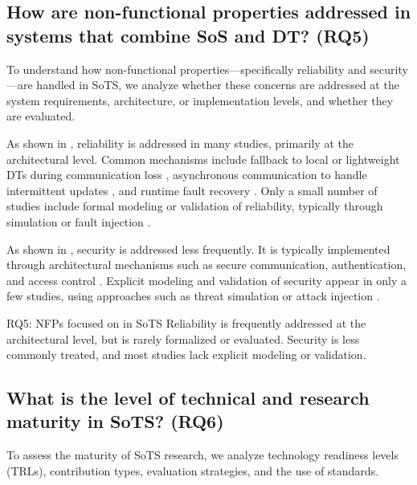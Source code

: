 \subsection{How are non-functional properties addressed in systems that combine SoS and DT? (RQ5)}\label{results-rq5}

To understand how non-functional properties---specifically reliability and security---are handled in SoTS, we analyze whether these concerns are addressed at the system requirements, architecture, or implementation levels, and whether they are evaluated.



As shown in , reliability is addressed in many studies, primarily at the architectural level. Common mechanisms include fallback to local or lightweight DTs during communication loss \cite{alam2017c2ps, larsen2024towards}, asynchronous communication to handle intermittent updates \cite{acharya2023twins, liu2020web-based}, and runtime fault recovery \cite{esterle2021digital, villalonga2021decision-making}. Only a small number of studies include formal modeling or validation of reliability, typically through simulation or fault injection \cite{park2020digital, saraeian2022digital}.

As shown in , security is addressed less frequently. It is typically implemented through architectural mechanisms such as secure communication, authentication, and access control \cite{aziz2022empowering, dobie2024network}. Explicit modeling and validation of security appear in only a few studies, using approaches such as threat simulation or attack injection \cite{malayjerdi2022combined, stary2022privacy}.

\begin{conclusionframe}{RQ5: NFPs focused on in SoTS}
Reliability is frequently addressed at the architectural level, but is rarely formalized or evaluated. Security is less commonly treated, and most studies lack explicit modeling or validation.
\end{conclusionframe}


\subsection{What is the level of technical and research maturity in SoTS? (RQ6)}\label{results-rq6}
To assess the maturity of SoTS research, we analyze technology readiness levels (TRLs), contribution types, evaluation strategies, and the use of standards.

